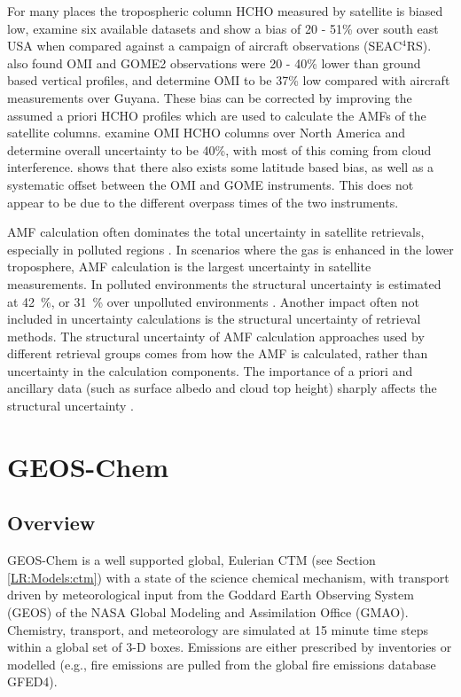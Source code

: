     For many places the tropospheric column HCHO measured by satellite is biased low, \textcite{Zhu2016} examine six available datasets and show a bias of 20 - 51\% over south east USA when compared against a campaign of aircraft observations (SEAC$^4$RS).
    \textcite{DeSmedt2015} also found OMI and GOME2 observations were 20 - 40\% lower than ground based vertical profiles, and \textcite{Barkley2013} determine OMI to be 37\% low compared with aircraft measurements over Guyana.
    These bias can be corrected by improving the assumed a priori HCHO profiles which are used to calculate the AMFs of the satellite columns.
    \textcite{Millet2006} examine OMI HCHO columns over North America and determine overall uncertainty to be 40\%, with most of this coming from cloud interference.
    \textcite{Millet2008} shows that there also exists some latitude based bias, as well as a systematic offset between the OMI and GOME instruments.
    This does not appear to be due to the different overpass times of the two instruments.
    
    AMF calculation often dominates the total uncertainty in satellite retrievals, especially in polluted regions \parencite{Lorente2017}.
    In scenarios where the gas is enhanced in the lower troposphere, AMF calculation is the largest uncertainty in satellite measurements.
    In polluted environments the structural uncertainty is estimated at 42~\%, or 31~\% over unpolluted environments \parencite{Lorente2017}.
    Another impact often not included in uncertainty calculations is the structural uncertainty of retrieval methods.
    The structural uncertainty of AMF calculation approaches used by different retrieval groups comes from how the AMF is calculated, rather than uncertainty in the calculation components.
    The importance of a priori and ancillary data (such as surface albedo and cloud top height) sharply affects the structural uncertainty \parencite{Lorente2017}.
    
\section{GEOS-Chem}
  \label{Model:GC}

  \subsection{Overview}
    GEOS-Chem is a well supported global, Eulerian CTM (see Section \ref{LR:Models:ctm}) with a state of the science chemical mechanism, with transport driven by meteorological input from the Goddard Earth Observing System (GEOS) of the NASA Global Modeling and Assimilation Office (GMAO).
    Chemistry, transport, and meteorology are simulated at 15 minute time steps within a global set of 3-D boxes.
    Emissions are either prescribed by inventories or modelled (e.g., fire emissions are pulled from the global fire emissions database GFED4).
    
